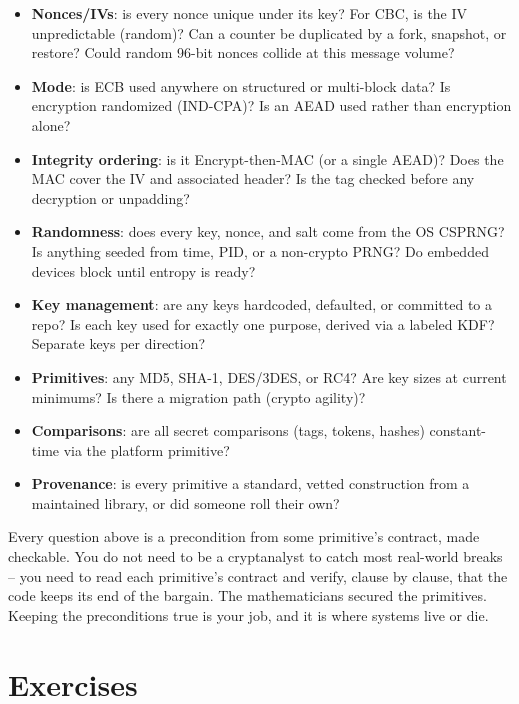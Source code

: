 \begin{itemize}
\item \textbf{Nonces/IVs}: is every nonce unique under its key? For CBC, is the IV unpredictable (random)? Can a counter be duplicated by a fork, snapshot, or restore? Could random 96-bit nonces collide at this message volume?
\item \textbf{Mode}: is ECB used anywhere on structured or multi-block data? Is encryption randomized (IND-CPA)? Is an AEAD used rather than encryption alone?
\item \textbf{Integrity ordering}: is it Encrypt-then-MAC (or a single AEAD)? Does the MAC cover the IV and associated header? Is the tag checked before any decryption or unpadding?
\item \textbf{Randomness}: does every key, nonce, and salt come from the OS CSPRNG? Is anything seeded from time, PID, or a non-crypto PRNG? Do embedded devices block until entropy is ready?
\item \textbf{Key management}: are any keys hardcoded, defaulted, or committed to a repo? Is each key used for exactly one purpose, derived via a labeled KDF? Separate keys per direction?
\item \textbf{Primitives}: any MD5, SHA-1, DES/3DES, or RC4? Are key sizes at current minimums? Is there a migration path (crypto agility)?
\item \textbf{Comparisons}: are all secret comparisons (tags, tokens, hashes) constant-time via the platform primitive?
\item \textbf{Provenance}: is every primitive a standard, vetted construction from a maintained library, or did someone roll their own?
\end{itemize}

\begin{recoverybox}
Every question above is a precondition from some primitive's contract, made checkable. You do not need to be a cryptanalyst to catch most real-world breaks -- you need to read each primitive's contract and verify, clause by clause, that the code keeps its end of the bargain. The mathematicians secured the primitives. Keeping the preconditions true is your job, and it is where systems live or die.
\end{recoverybox}

\section*{Exercises}

